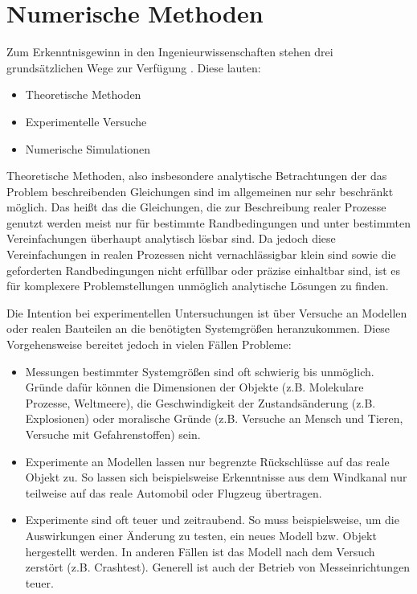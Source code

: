 \section{Numerische Methoden}

Zum Erkenntnisgewinn in den Ingenieurwissenschaften stehen drei grundsätzlichen
Wege zur Verfügung \cite{num_maschbau}. Diese lauten:
\begin{itemize}
  \item Theoretische Methoden
  \item Experimentelle Versuche
  \item Numerische Simulationen
\end{itemize}

Theoretische Methoden, also insbesondere analytische Betrachtungen der das Problem
beschreibenden Gleichungen sind im allgemeinen nur sehr beschränkt möglich. Das heißt das
die Gleichungen, die zur Beschreibung realer Prozesse genutzt werden meist nur für
bestimmte Randbedingungen und unter bestimmten Vereinfachungen überhaupt analytisch lösbar
sind. Da jedoch diese Vereinfachungen in realen Prozessen nicht vernachlässigbar klein sind
sowie die geforderten Randbedingungen nicht erfüllbar oder präzise einhaltbar sind, ist es
für komplexere Problemstellungen unmöglich analytische Lösungen zu finden.

Die Intention bei experimentellen Untersuchungen ist über Versuche an Modellen oder
realen Bauteilen an die benötigten Systemgrößen heranzukommen. Diese Vorgehensweise
bereitet jedoch in vielen Fällen Probleme:
\begin{itemize}
  \item Messungen bestimmter Systemgrößen sind oft schwierig bis unmöglich. Gründe
    dafür können die Dimensionen der Objekte (z.B. Molekulare Prozesse, Weltmeere),
    die Geschwindigkeit der Zustandsänderung (z.B. Explosionen) oder moralische Gründe
    (z.B. Versuche an Mensch und Tieren, Versuche mit Gefahrenstoffen) sein.
  \item Experimente an Modellen lassen nur begrenzte Rückschlüsse auf das reale Objekt
    zu. So lassen sich beispielsweise Erkenntnisse aus dem Windkanal nur teilweise auf
    das reale Automobil oder Flugzeug übertragen.
  \item Experimente sind oft teuer und zeitraubend. So muss beispielsweise, um die Auswirkungen
    einer Änderung zu testen, ein neues Modell bzw. Objekt hergestellt werden. In anderen Fällen
    ist das Modell nach dem Versuch zerstört (z.B. Crashtest). Generell ist auch der Betrieb
    von Messeinrichtungen teuer.
\end{itemize}


